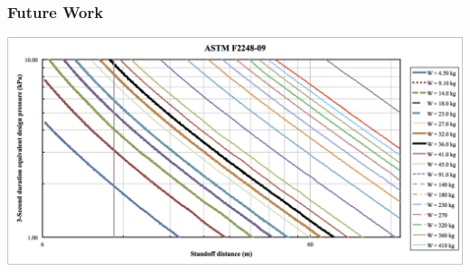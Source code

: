 \documentclass[t,12pt,numbers,fleqn]{beamer}
\begin{document}
\begin{frame}[plain]

\frametitle{Future Work}

\includegraphics[width=1.\textwidth]{../Figures/ASTM_F2248-09.png}

\end{frame}


\end{document}
